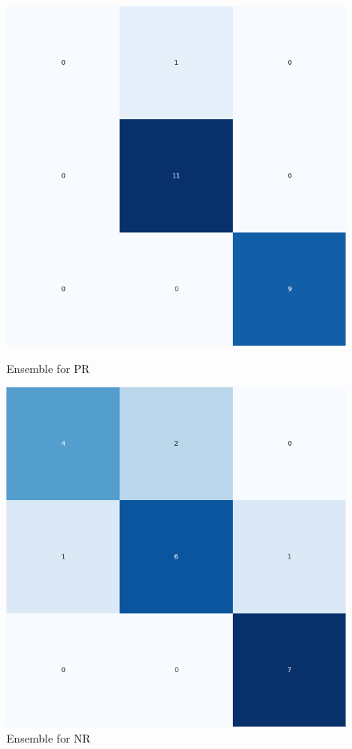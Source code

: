 \begin{figure}[H]
    \centering
    \begin{minipage}[b]{0.45\textwidth}
        \includegraphics[width=\textwidth]{./class_specificxtra_section/ensemble_plots/ensemble_confusion_matrix_PR.png}
        \caption{Ensemble for PR}
        \label{fig_class:specxtra_ensemble_pr}
    \end{minipage}
    \hfill
    \begin{minipage}[b]{0.45\textwidth}
        \includegraphics[width=\textwidth]{./class_specificxtra_section/ensemble_plots/ensemble_confusion_matrix_NR.png}
        \caption{Ensemble for NR}
        \label{fig_class:specxtra_ensemble_nr}
    \end{minipage}
\end{figure}

